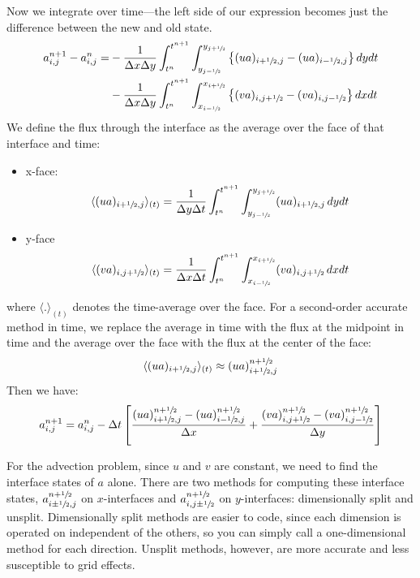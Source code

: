 Now we integrate over time---the left side of our expression becomes
just the difference between the new and old state.
\begin{align}
 a_{i,j}^{n+1} - a_{i,j}^n =
  &- \frac{1}{\Delta x\Delta y} \int_{t^n}^{t^{n+1}} \int_{y_{j-{\sfrac{1}{2}}}}^{y_{j+{\sfrac{1}{2}}}}
     \left \{ (u a)_{i+{\sfrac{1}{2}},j} - (u a)_{i-{\sfrac{1}{2}},j} \right \} dy dt \nonumber \\
  &- \frac{1}{\Delta x\Delta y} \int_{t^n}^{t^{n+1}} \int_{x_{i-{\sfrac{1}{2}}}}^{x_{i+{\sfrac{1}{2}}}}
     \left \{ (v a)_{i,j+{\sfrac{1}{2}}} - (v a)_{i,j-{\sfrac{1}{2}}} \right \} dx dt
\label{eq:update2du}
\end{align}
We define the flux through the interface as the average over the face
of that interface and time: 
\begin{itemize}
\item x-face:
\begin{equation}
\langle (ua)_{i+{\sfrac{1}{2}},j}\rangle_{(t)} = \frac{1}{\Delta y \Delta t}
    \int_{t^n}^{t^{n+1}} \int_{y_{j-{\sfrac{1}{2}}}}^{y_{j+{\sfrac{1}{2}}}} (ua)_{i+{\sfrac{1}{2}},j}\, dy dt
\end{equation}
\item y-face
\begin{equation}
\langle (va)_{i,j+{\sfrac{1}{2}}}\rangle_{(t)} = \frac{1}{\Delta x \Delta t}
    \int_{t^n}^{t^{n+1}} \int_{x_{i-{\sfrac{1}{2}}}}^{x_{i+{\sfrac{1}{2}}}} (va)_{i,j+{\sfrac{1}{2}}}\, dx dt
\end{equation}
\end{itemize}
where $\langle . \rangle_{(t)}$ denotes the time-average over the face.
For a second-order accurate method in time, we replace the average in
time with the flux at the midpoint in time and the average over the face
with the flux at the center of the face:
\begin{equation}
\langle (ua)_{i+{\sfrac{1}{2}},j} \rangle_{(t)} \approx (ua)_{i+{\sfrac{1}{2}},j}^{n+{\sfrac{1}{2}}}
\end{equation}
Then we have:
\begin{equation}
a_{i,j}^{n+1} = a_{i,j}^n - \Delta t \left [
   \frac{(ua)_{i+{\sfrac{1}{2}},j}^{n+{\sfrac{1}{2}}} - (ua)_{i-{\sfrac{1}{2}},j}^{n+{\sfrac{1}{2}}}}{\Delta x} +
   \frac{(va)_{i,j+{\sfrac{1}{2}}}^{n+{\sfrac{1}{2}}} - (va)_{i,j-{\sfrac{1}{2}}}^{n+{\sfrac{1}{2}}}}{\Delta y} \right ]
\end{equation}

For the advection problem, since $u$ and $v$ are constant, we need
to find the interface states of $a$ alone.
There are two methods for computing these interface states,
$a_{i\pm{\sfrac{1}{2}},j}^{n+{\sfrac{1}{2}}}$ on $x$-interfaces and  $a_{i,j\pm{\sfrac{1}{2}}}^{n+{\sfrac{1}{2}}}$ on $y$-interfaces:
dimensionally split and unsplit.  Dimensionally split methods are
easier to code, since each dimension is operated on independent of the
others, so you can simply call a one-dimensional method for each
direction.  Unsplit methods, however, are more accurate and less
susceptible to grid effects.  

